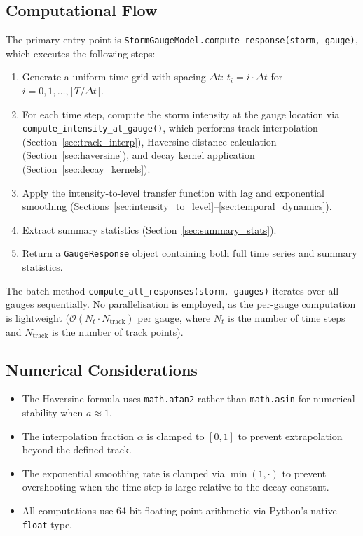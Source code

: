 \documentclass[11pt,a4paper]{article}
\begin{document}
\subsection{Computational Flow}

The primary entry point is \texttt{StormGaugeModel.compute\_response(storm, gauge)},
which executes the following steps:

\begin{enumerate}[nosep]
    \item Generate a uniform time grid with spacing $\Delta t$:
          $t_i = i \cdot \Delta t$ for $i = 0, 1, \ldots, \lfloor T / \Delta t \rfloor$.
    \item For each time step, compute the storm intensity at the gauge location
          via \texttt{compute\_intensity\_at\_gauge()}, which performs track
          interpolation (Section~\ref{sec:track_interp}), Haversine distance
          calculation (Section~\ref{sec:haversine}), and decay kernel application
          (Section~\ref{sec:decay_kernels}).
    \item Apply the intensity-to-level transfer function with lag and exponential
          smoothing (Sections~\ref{sec:intensity_to_level}--\ref{sec:temporal_dynamics}).
    \item Extract summary statistics (Section~\ref{sec:summary_stats}).
    \item Return a \texttt{GaugeResponse} object containing both full time series
          and summary statistics.
\end{enumerate}

The batch method \texttt{compute\_all\_responses(storm, gauges)} iterates over
all gauges sequentially. No parallelisation is employed, as the per-gauge
computation is lightweight ($\mathcal{O}(N_t \cdot N_{\text{track}})$ per gauge,
where $N_t$ is the number of time steps and $N_{\text{track}}$ is the number of
track points).

\subsection{Numerical Considerations}

\begin{itemize}[nosep]
    \item The Haversine formula uses \texttt{math.atan2} rather than
          \texttt{math.asin} for numerical stability when $a \approx 1$.
    \item The interpolation fraction $\alpha$ is clamped to $[0, 1]$ to prevent
          extrapolation beyond the defined track.
    \item The exponential smoothing rate is clamped via $\min(1, \cdot)$ to
          prevent overshooting when the time step is large relative to the decay
          constant.
    \item All computations use 64-bit floating point arithmetic via Python's
          native \texttt{float} type.
\end{itemize}
\end{document}
